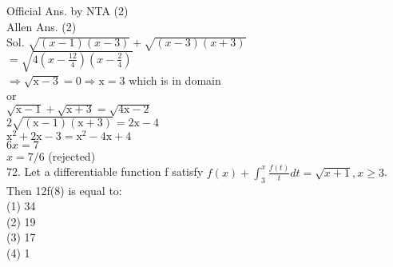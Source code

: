 \documentclass[10pt]{article}
\begin{document}
Official Ans. by NTA (2)\\
Allen Ans. (2)\\
Sol. \(\sqrt{(x-1)(x-3)}+\sqrt{(x-3)(x+3)}\)\\
\(=\sqrt{4\left(x-\frac{12}{4}\right)\left(x-\frac{2}{4}\right)}\)\\
\(\Rightarrow \sqrt{\mathrm{x}-3}=0 \Rightarrow \mathrm{x}=3\) which is in domain\\
or\\
\(\sqrt{\mathrm{x}-1}+\sqrt{\mathrm{x}+3}=\sqrt{4 \mathrm{x}-2}\)\\
\(2 \sqrt{(\mathrm{x}-1)(\mathrm{x}+3)}=2 \mathrm{x}-4\)\\
\(\mathrm{x}^{2}+2 \mathrm{x}-3=\mathrm{x}^{2}-4 \mathrm{x}+4\)\\
\(6 x=7\)\\
\(x=7 / 6\) (rejected)\\
72. Let a differentiable function f satisfy \(f(x)+\int_{3}^{x} \frac{f(t)}{t} d t=\sqrt{x+1}, x \geq 3\). Then 12f(8) is equal to:\\
(1) 34\\
(2) 19\\
(3) 17\\
(4) 1
\end{document}
